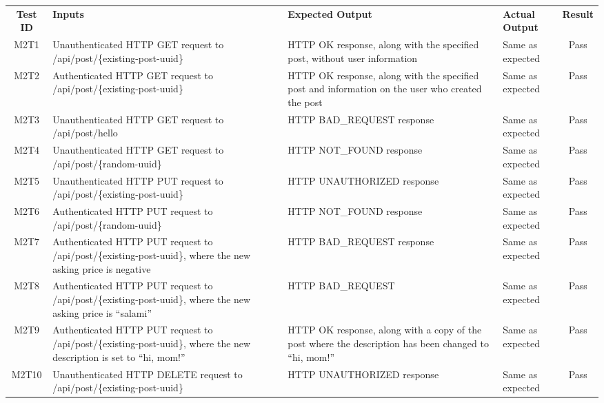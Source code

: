 \documentclass[fullpage]{article}
\begin{document}
\begin{table}[H]
\flushleft
\begin{tabular}{|c|p{4.5cm}|p{3.6cm}|p{3.6cm}|c|}
\hline
 \rowcolor{lightgray}
\textbf{Test ID} &\textbf{Inputs} &\textbf{Expected Output} &\textbf{Actual Output} &\textbf{Result}\\
M2T1 & Unauthenticated HTTP GET request to /api/post/\{existing-post-uuid\} & HTTP OK response, along with the specified post, without user information & Same as expected & Pass\\
\hline
M2T2 & Authenticated HTTP GET request to /api/post/\{existing-post-uuid\} & HTTP OK response, along with the specified post and information on the user who created the post  & Same as expected & Pass \\
\hline
M2T3 & Unauthenticated HTTP GET request to /api/post/hello & HTTP BAD\_REQUEST response  & Same as expected & Pass \\
\hline
M2T4 & Unauthenticated HTTP GET request to /api/post/\{random-uuid\} & HTTP NOT\_FOUND response  & Same as expected & Pass \\
\hline
M2T5 & Unauthenticated HTTP PUT request to /api/post/\{existing-post-uuid\} & HTTP UNAUTHORIZED response & Same as expected & Pass \\
\hline
M2T6 & Authenticated HTTP PUT request to /api/post/\{random-uuid\} & HTTP NOT\_FOUND response & Same as expected & Pass \\
\hline
M2T7 & Authenticated HTTP PUT request to /api/post/\{existing-post-uuid\}, where the new asking price is negative & HTTP BAD\_REQUEST response & Same as expected & Pass \\
\hline
M2T8 & Authenticated HTTP PUT request to /api/post/\{existing-post-uuid\}, where the new asking price is ``salami'' & HTTP BAD\_REQUEST & Same as expected & Pass \\
\hline
M2T9 & Authenticated HTTP PUT request to /api/post/\{existing-post-uuid\}, where the new description is set to ``hi, mom!'' & HTTP OK response, along with a copy of the post where the description has been changed to ``hi, mom!'' & Same as expected & Pass \\
\hline
M2T10 & Unauthenticated HTTP DELETE request to /api/post/\{existing-post-uuid\} & HTTP UNAUTHORIZED response & Same as expected & Pass \\
\hline
\end{tabular}
\end{table}
\end{document}
